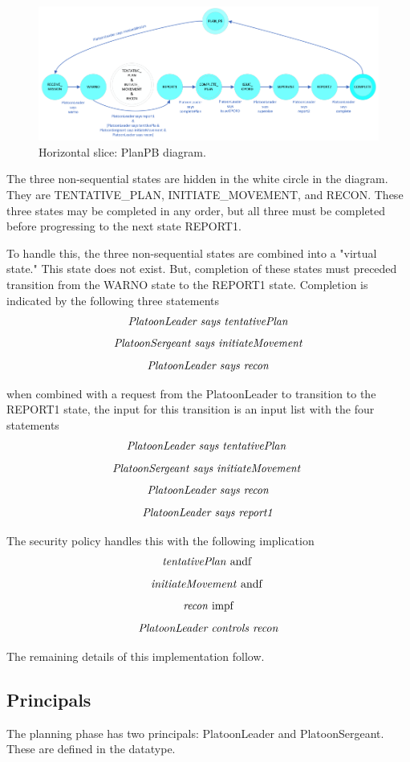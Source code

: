 \documentclass[../../main/main.tex]{subfiles}
\begin{document}
\begin{figure}[h!]
\centering
\includegraphics[width=\textwidth]{../figures/ssmPlanPBDiagram}
\caption{\label{ssmPlanPBDiagram2} Horizontal slice: PlanPB diagram.}
\end{figure}

The three non-sequential states are hidden in the white circle in the diagram.  They are TENTATIVE_PLAN, INITIATE_MOVEMENT, and RECON. These three states may be completed in any order, but all three must be completed before progressing to the next state REPORT1.  

To handle this, the three non-sequential states are combined into a "virtual state."  This state does not exist.  But, completion of these states must preceded transition from the WARNO state to the REPORT1 state.  Completion is indicated by the following three  statements
\[\text{\textit{PlatoonLeader says tentativePlan}}\]
\[\text{\textit{PlatoonSergeant says initiateMovement}}\]
\[\text{\textit{PlatoonLeader says recon}}\]


when combined with a request from the PlatoonLeader to transition to the REPORT1 state, the input for this transition is an input list with the four statements
\[\text{\textit{PlatoonLeader says tentativePlan}  }\]
\[\text{\textit{PlatoonSergeant says initiateMovement}  }\]
\[\text{\textit{PlatoonLeader says recon}}\]
\[\text{\textit{PlatoonLeader says report1}}\]

The security policy handles this with the following implication
\[\text{\textit{tentativePlan} andf  }\]
\[\text{\textit{initiateMovement} andf  }\]
\[\text{\textit{recon} impf}\]
\[\text{\textit{PlatoonLeader controls recon}}\]

The remaining details of this implementation follow.
\subsection{Principals}
The planning phase  has two principals: PlatoonLeader and PlatoonSergeant.  These are defined in the  datatype.
\end{document}
